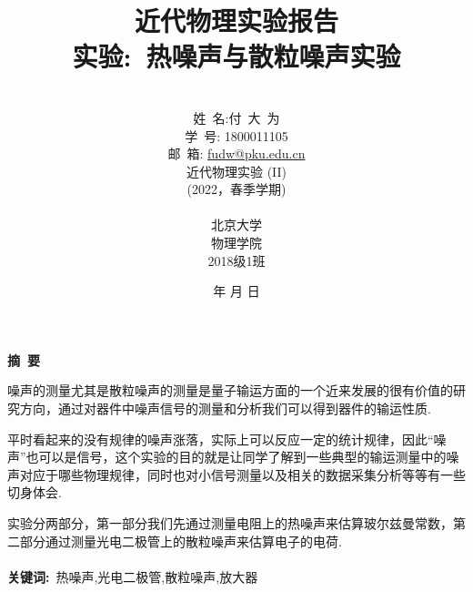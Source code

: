 \documentclass[a4paper]{article}
\begin{document}
\renewcommand{\contentsname}{目\ 录}
\renewcommand{\appendixname}{附录}
\renewcommand{\appendixpagename}{附录}
\renewcommand{\refname}{参考文献} 
\renewcommand{\figurename}{图}
\renewcommand{\tablename}{表}
\renewcommand{\today}{\number\year 年 \number\month 月 \number\day 日}
\newcommand{\refeq}[1]{\textbf{Eq.(\ref{#1})}}
\newcommand*{\circled}[1]{\lower.7ex\hbox{\tikz\draw (0pt, 0pt)%
    circle (.5em) node {\makebox[1em][c]{\small #1}};}}
    
\title{{\Huge 近代物理实验报告{\large\linebreak\\}}{\Large 实验:\ 热噪声与散粒噪声实验\linebreak\linebreak}}
\author{\\姓\ 名:付\ 大\ 为\\
学\ 号: 1800011105\\
邮\ 箱: \url{fudw@pku.edu.cn}\\
近代物理实验 (II)\\
(2022，春季学期)\\\\
北京大学\\
物理学院\\
2018级1班}
\date{\today}
\maketitle
\newpage

\begin{center}
{\Large\bf{摘\ 要\\}}
\end{center}

噪声的测量尤其是散粒噪声的测量是量子输运方面的一个近来发展的很有价值的研
究方向，通过对器件中噪声信号的测量和分析我们可以得到器件的输运性质.

平时看起来的没有规律的噪声涨落，实际上可以反应一定的统计规律，因此“噪声”也可以是信号，这个实验的目的就是让同学了解到一些典型的输运测量中的噪声对应于哪些物理规律，同时也对小信号测量以及相关的数据采集分析等等有一些切身体会.

实验分两部分，第一部分我们先通过测量电阻上的热噪声来估算玻尔兹曼常数，第二部分通过测量光电二极管上的散粒噪声来估算电子的电荷.
\\\\
{\bf{关键词}:}\ 热噪声,光电二极管,散粒噪声,放大器
\end{document}
